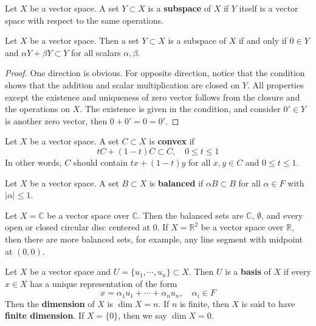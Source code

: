 \begin{defn} Let $X$ be a vector space. A set $Y\subset X$ is a \textbf{subspace} of $X$ if $Y$ itself is a vector space with respect to the same operations.
\end{defn}

\begin{prop} Let $X$ be a vector space. Then a set $Y\subset X$ is a subspace of $X$ if and only if $0\in Y$ and $\alpha Y+\beta Y\subset Y$ for all scalars $\alpha,\beta$.
\end{prop}
\begin{proof}
One direction is obvious. For opposite direction, notice that the condition shows that the addition and scalar multiplication are closed on $Y$. All properties except the existence and uniqueness of zero vector follows from the closure and the operations on $X$. The existence is given in the condition, and consider $0'\in Y$ is another zero vector, then $0+0'=0=0'$.
\end{proof}

\begin{defn} Let $X$ be a vector space. A set $C\subset X$ is \textbf{convex} if
\begin{equation}
tC+(1-t)C\subset C,\quad 0\leq t\leq 1
\end{equation}
In other words, $C$ should contain $tx+(1-t)y$ for all $x,y\in C$ and $0\leq t\leq 1$.
\end{defn}

\begin{defn} Let $X$ be a vector space. A set $B\subset X$ is \textbf{balanced} if $\alpha B\subset B$ for all $\alpha \in F$ with $|\alpha|\leq 1$.
\end{defn}

\begin{exmp} Let $X=\mathbb{C}$ be a vector space over $\mathbb{C}$. Then the balanced sets are $\mathbb{C}$, $\emptyset$, and every open or closed circular disc centered at $0$. If $X=\mathbb{R}^2$ be a vector space over $\mathbb{R}$, then there are more balanced sets, for example, any line segment with midpoint at $(0,0)$.
\end{exmp}

\begin{defn} Let $X$ be a vector space and $U=\{u_1,\cdots, u_n\}\subset X$. Then $U$ is a \textbf{basis} of $X$ if every $x\in X$ has a unique representation of the form
\begin{equation}
x=\alpha_1 u_1+\cdots+\alpha_n u_n,\quad \alpha_i\in F
\end{equation}
Then the \textbf{dimension} of $X$ is $\dim X=n$. If $n$ is finite, then $X$ is said to have \textbf{finite dimension}. If $X=\{0\}$, then we say $\dim X=0$.
\end{defn}

